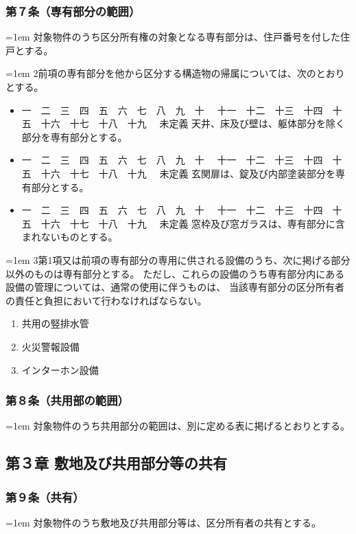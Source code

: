 \documentclass[
  luatex,
  paper=a4paper,
  fontsize=11pt,
  jafontsize=11pt,
  jlreq_notes,
]{jlreq}
\newcommand{\joumain}[1]{%
  \noindent\hangindent=1em\hangafter=1
  \hspace{1em}#1%
}
\newcommand{\kou}[2]{%
  \par\noindent\hangindent=1em\hangafter=1
  #1\hspace{1em}#2%
}
\def\toKansuji#1{
  \tempvls=#1
  \ifcase\tempvls
    \or 一　\or 二　\or 三　\or 四　\or 五　\or 六　\or 七　\or 八　\or 九　\or 十　
    \or 十一　\or 十二　\or 十三　\or 十四　\or 十五　\or 十六　\or 十七　\or 十八　\or 十九　
  \else 未定義
  \fi
}
\begin{document}
  \subsubsection*{第７条（専有部分の範囲）}
  \joumain{対象物件のうち区分所有権の対象となる専有部分は、住戸番号を付した住戸とする。}
  \kou{2}{前項の専有部分を他から区分する構造物の帰属については、次のとおりとする。}
  \begin{itemize}[label={}, leftmargin=3em, itemindent=-2em]
    \item \toKansuji{1}天井、床及び壁は、躯体部分を除く部分を専有部分とする。
    \item \toKansuji{2}玄関扉は、錠及び内部塗装部分を専有部分とする。
    \item \toKansuji{3}窓枠及び窓ガラスは、専有部分に含まれないものとする。 
  \end{itemize}
  \kou{3}{第1項又は前項の専有部分の専用に供される設備のうち、次に掲げる部分以外のものは専有部分とする。
  ただし、これらの設備のうち専有部分内にある設備の管理については、通常の使用に伴うものは、
  当該専有部分の区分所有者の責任と負担において行わなければならない。}
  \begin{enumerate}
    \item 共用の竪排水管
    \item 火災警報設備
    \item インターホン設備
  \end{enumerate}


  \subsubsection*{第８条（共用部の範囲）}
  \joumain{対象物件のうち共用部分の範囲は、別に定める表に掲げるとおりとする。}
  
  \begin{center}
    \subsection*{第３章 敷地及び共用部分等の共有}
  \end{center}

  \subsubsection*{第９条（共有）}
  \joumain{対象物件のうち敷地及び共用部分等は、区分所有者の共有とする。}
\end{document}
